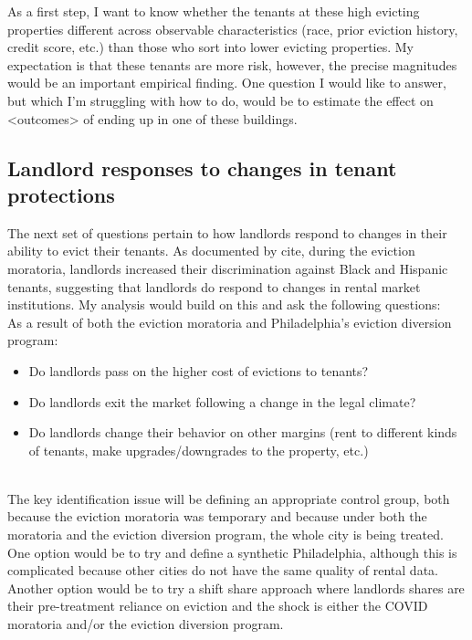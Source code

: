 \documentclass{article}
\begin{document}
As a first step, I want to know whether the tenants at these high evicting properties different across observable characteristics (race, prior eviction history, credit score, etc.) than those who sort into lower evicting properties. My expectation is that these tenants are more risk, however, the precise magnitudes would be an important empirical finding. One question I would like to answer, but which I'm struggling with how to do, would be to estimate the effect on <outcomes> of ending up in one of these buildings. \\


\subsection{Landlord responses to changes in tenant protections}

The next set of questions pertain to how landlords respond to changes in their ability to evict their tenants. As documented by cite, during the eviction moratoria, landlords increased their discrimination against Black and Hispanic tenants, suggesting that landlords do respond to changes in rental market institutions. My analysis would build on this and ask the following questions:\\

As a result of both the eviction moratoria and Philadelphia's eviction diversion program:\\


\begin{itemize}
    \item Do landlords pass on the higher cost of evictions to tenants?
    \item Do landlords exit the market following a change in the legal climate?
    \item Do landlords change their behavior on other margins (rent to different kinds of tenants, make upgrades/downgrades to the property, etc.)
\end{itemize} \\

The key identification issue will be defining an appropriate control group, both because the eviction moratoria was temporary and because under both the moratoria and the eviction diversion program, the whole city is being treated. One option would be to try and define a synthetic Philadelphia, although this is complicated because other cities do not have the same quality of rental data. Another option would be to try a shift share approach where landlords shares are their pre-treatment reliance on eviction and the shock is either the COVID moratoria and/or the eviction diversion program. \\
\end{document}
